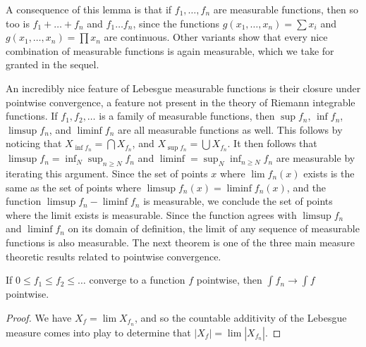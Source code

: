 A consequence of this lemma is that if $f_1, \dots, f_n$ are measurable functions, then so too is $f_1 + \dots + f_n$ and $f_1 \dots f_n$, since the functions $g(x_1, \dots, x_n) = \sum x_i$ and $g(x_1, \dots, x_n) = \prod x_n$ are continuous. Other variants show that every nice combination of measurable functions is again measurable, which we take for granted in the sequel.

An incredibly nice feature of Lebesgue measurable functions is their closure under pointwise convergence, a feature not present in the theory of Riemann integrable functions. If $f_1, f_2, \dots$ is a family of measurable functions, then $\sup f_n$, $\inf f_n$, $\limsup f_n$, and $\liminf f_n$ are all measurable functions as well. This follows by noticing that $X_{\inf f_n} = \bigcap X_{f_n}$, and $X_{\sup f_n} = \bigcup X_{f_n}$. It then follows that $\limsup f_n = \inf_N \sup_{n \geq N} f_n$ and $\liminf = \sup_N \inf_{n \geq N} f_n$ are measurable by iterating this argument. Since the set of points $x$ where $\lim f_n(x)$ exists is the same as the set of points where $\limsup f_n(x) = \liminf f_n(x)$, and the function $\limsup f_n - \liminf f_n$ is measurable, we conclude the set of points where the limit exists is measurable. Since the function agrees with $\limsup f_n$ and $\liminf f_n$ on its domain of definition, the limit of any sequence of measurable functions is also measurable. The next theorem is one of the three main measure theoretic results related to pointwise convergence.

\begin{theorem}
  If $0 \leq f_1 \leq f_2 \leq \dots$ converge to a function $f$ pointwise, then $\int f_n \to \int f$ pointwise.
\end{theorem}
\begin{proof}
  We have $X_f = \lim X_{f_n}$, and so the countable additivity of the Lebesgue measure comes into play to determine that $|X_f| = \lim |X_{f_n}|$.
\end{proof}

